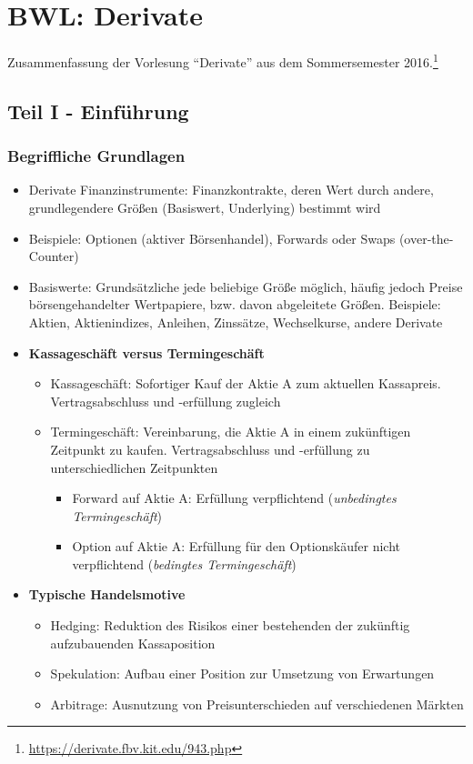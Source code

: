 \chapter{BWL: Derivate}

Zusammenfassung der Vorlesung "`Derivate"' aus dem Sommersemester 2016.\footnote{\url{https://derivate.fbv.kit.edu/943.php}}

\section{Teil I - Einführung}

\subsection{Begriffliche Grundlagen}
\begin{itemize}
	\item Derivate Finanzinstrumente: Finanzkontrakte, deren Wert durch andere, grundlegendere Größen (Basiswert, Underlying) bestimmt wird
	\item Beispiele: Optionen (aktiver Börsenhandel), Forwards oder Swaps (over-the-Counter)
	\item Basiswerte: Grundsätzliche jede beliebige Größe möglich, häufig jedoch Preise börsengehandelter Wertpapiere, bzw. davon abgeleitete Größen. Beispiele: Aktien, Aktienindizes, Anleihen, Zinssätze, Wechselkurse, andere Derivate
	\item \textbf{Kassageschäft versus Termingeschäft}
	\begin{itemize}
		\item Kassageschäft: Sofortiger Kauf der Aktie A zum aktuellen Kassapreis. Vertragsabschluss und -erfüllung zugleich
		\item Termingeschäft: Vereinbarung, die Aktie A in einem zukünftigen Zeitpunkt zu kaufen. Vertragsabschluss und -erfüllung zu unterschiedlichen Zeitpunkten
		\begin{itemize}
			\item Forward auf Aktie A: Erfüllung verpflichtend (\textit{unbedingtes Termingeschäft})
			\item Option auf Aktie A: Erfüllung für den Optionskäufer nicht verpflichtend (\textit{bedingtes Termingeschäft})
		\end{itemize}
	\end{itemize}
	\item \textbf{Typische Handelsmotive}
	\begin{itemize}
		\item Hedging: Reduktion des Risikos einer bestehenden der zukünftig aufzubauenden Kassaposition
		\item Spekulation: Aufbau einer Position zur Umsetzung von Erwartungen
		\item Arbitrage: Ausnutzung von Preisunterschieden auf verschiedenen Märkten
	\end{itemize}
\end{itemize}

